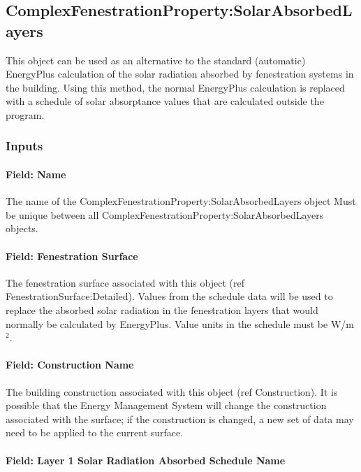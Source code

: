 \subsection{ComplexFenestrationProperty:SolarAbsorbedLayers}\label{complexfenestrationpropertysolarabsorbedlayers}

This object can be used as an alternative to the standard (automatic) EnergyPlus calculation of the solar radiation absorbed by fenestration systems in the building. Using this method, the normal EnergyPlus calculation is replaced with a schedule of solar absorptance values that are calculated outside the program.

\subsubsection{Inputs}\label{inputs-15}

\paragraph{Field: Name}\label{field-name-11}

The name of the ComplexFenestrationProperty:SolarAbsorbedLayers object Must be unique between all ComplexFenestrationProperty:SolarAbsorbedLayers objects.

\paragraph{Field: Fenestration Surface}\label{field-fenestration-surface}

The fenestration surface associated with this object (ref FenestrationSurface:Detailed). Values from the schedule data will be used to replace the absorbed solar radiation in the fenestration layers that would normally be calculated by EnergyPlus. Value units in the schedule must be W/m\(^{2}\).

\paragraph{Field: Construction Name}\label{field-construction-name-2}

The building construction associated with this object (ref Construction). It is possible that the Energy Management System will change the construction associated with the surface; if the construction is changed, a new set of data may need to be applied to the current surface.

\paragraph{Field: Layer 1 Solar Radiation Absorbed Schedule Name}\label{field-layer-1-solar-radiation-absorbed-schedule-name}

